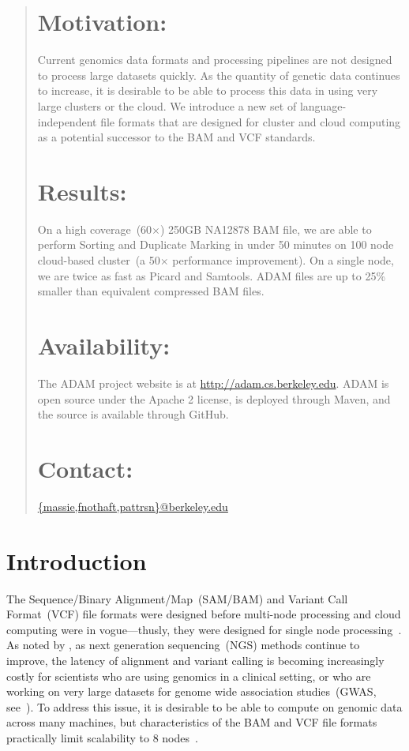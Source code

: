 \documentclass{bioinfo}
\begin{document}
\begin{abstract}

\section{Motivation:}
Current genomics data formats and processing pipelines are not designed to process large datasets quickly. As the quantity of genetic data continues to increase, it is 
desirable to be able to process this data in using very large clusters or the cloud. We introduce a new set of language-independent file formats that are designed for
cluster and cloud computing as a potential successor to the BAM and VCF standards.

\section{Results:} On a high coverage~(60$\times$) 250GB NA12878 BAM file, we are able to perform Sorting and Duplicate Marking in under 50 minutes on 100 node
cloud-based cluster~(a 50$\times$ performance improvement). On a single node, we are twice as fast as Picard and Samtools. ADAM files are up to 25\%
smaller than equivalent compressed BAM files.

\section{Availability:}
The ADAM project website is at \url{http://adam.cs.berkeley.edu}. ADAM is open source under the Apache 2 license, is deployed through Maven,
and the source is available through GitHub.

\section{Contact:} \href{massie@berkeley.edu}{\{massie,fnothaft,pattrsn\}@berkeley.edu}
\end{abstract}

\section{Introduction}
\label{sec:introduction}

The Sequence/Binary Alignment/Map~(SAM/BAM) and Variant Call Format~(VCF) file formats were designed before multi-node processing and cloud computing were
in vogue---thusly, they were designed for single node processing~\citep{li09}. As noted by \citet{mcpherson09}, as next generation sequencing~(NGS) methods continue
to improve, the latency of alignment and variant calling is becoming increasingly costly for scientists who are using genomics in a clinical setting, or who are working on
very large datasets for genome wide association studies~(GWAS, see~\citet{wang05}). To address this issue, it is desirable to be able to compute on genomic data across
many machines, but characteristics of the BAM and VCF file formats practically limit scalability to 8 nodes~\citep{niemenmaa12}.
\end{document}
